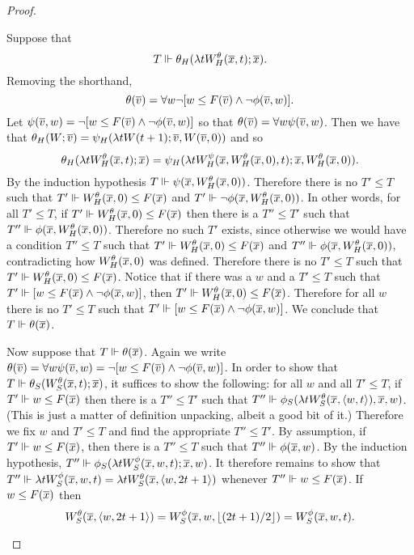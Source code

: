 \begin{proof}
\begin{itemize}
Suppose that
$$T\Vdash\theta_H(\lambda tW_H^\theta(\overline{x},t);\overline{x}).$$
Removing the shorthand,
$$\theta(\overline{v})=\forall w\neg[w\leq F(\overline{v})\land\neg\phi(\overline{v},w)].$$
Let $\psi(\overline{v},w)=\neg[w\leq F(\overline{v})\land\neg\phi(\overline{v},w)]$
so that $\theta(\overline{v})=\forall w\psi(\overline{v},w)$.
Then we have that $\theta_H(W;\overline{v})=\psi_H(\lambda tW(t+1);\overline{v},W(\overline{v},0))$
and so
$$\theta_H(\lambda tW_H^\theta(\overline{x},t);\overline{x})
	=\psi_H(\lambda tW_H^\psi(\overline{x},W^\theta_H(\overline{x},0),t);\overline{x},W^\theta_H(\overline{x},0)).$$
By the induction hypothesis $T\Vdash\psi(\overline{x},W^\theta_H(\overline{x},0))$.
Therefore there is no $T'\leq T$ such that
$T'\Vdash W^\theta_H(\overline{x},0)\leq F(\overline{x})$ and $T'\Vdash\neg\phi(\overline{x},W^\theta_H(\overline{x},0))$.
In other words, for all $T'\leq T$, if $T'\Vdash W^\theta_H(\overline{x},0)\leq F(\overline{x})$
then there is a $T''\leq T'$ such that $T''\Vdash\phi(\overline{x},W^\theta_H(\overline{x},0))$.
Therefore no such $T'$ exists, since otherwise we would have a condition $T''\leq T$
such that $T'\Vdash W^\theta_H(\overline{x},0)\leq F(\overline{x})$ and
$T''\Vdash\phi(\overline{x},W^\theta_H(\overline{x},0))$, contradicting how $W^\theta_H(\overline{x},0)$ was defined.
Therefore there is no $T'\leq T$ such that $T'\Vdash W^\theta_H(\overline{x},0)\leq F(\overline{x})$.
Notice that if there was a $w$ and a $T'\leq T$ such that
$T'\Vdash[w\leq F(\overline{x})\land\neg\phi(\overline{x},w)]$, then $T'\Vdash W^\theta_H(\overline{x},0)\leq F(\overline{x})$.
Therefore for all $w$ there is no $T'\leq T$ such that $T'\Vdash[w\leq F(\overline{x})\land\neg\phi(\overline{x},w)]$.
We conclude that $T\Vdash\theta(\overline{x})$.

Now suppose that $T\Vdash\theta(\overline{x})$.
Again we write $\theta(\overline{v})=\forall w\psi(\overline{v},w)=\neg[w\leq F(\overline{v})\land\neg\phi(\overline{v},w)]$.
In order to show that $T\Vdash\theta_S(W^\theta_S(\overline{x},t);\overline{x})$,
it suffices to show the following: for all $w$ and all $T'\leq T$,
if $T'\Vdash w\leq F(\overline{x})$ then there is a $T''\leq T'$ such that
$T''\Vdash\phi_S(\lambda tW^\theta_S(\overline{x},\langle w,t\rangle),\overline{x},w)$.
(This is just a matter of definition unpacking, albeit a good bit of it.)
Therefore we fix $w$ and $T'\leq T$ and find the appropriate $T''\leq T'$.
By assumption, if $T'\Vdash w\leq F(\overline{x})$,
then there is a $T''\leq T$ such that $T''\Vdash\phi(\overline{x},w)$.
By the induction hypothesis, $T''\Vdash\phi_S(\lambda tW^\phi_S(\overline{x},w,t);\overline{x},w)$.
It therefore remains to show that
$T''\Vdash\lambda tW^\phi_S(\overline{x},w,t)=\lambda tW^\theta_S(\overline{x},\langle w,2t+1\rangle)$
whenever $T''\Vdash w\leq F(\overline{x})$.
If $w\leq F(\overline{x})$ then
$$W^\theta_S(\overline{x},\langle w,2t+1\rangle)
	=W^\phi_S(\overline{x},w,\lfloor(2t+1)/2\rfloor)
	=W^\phi_S(\overline{x},w,t).$$
\end{itemize}
\end{proof}

